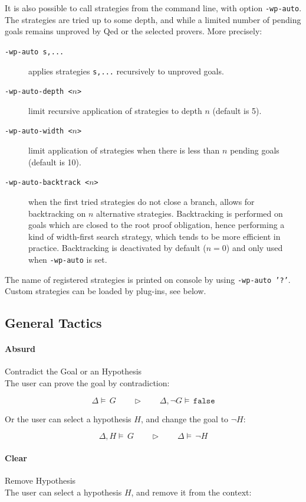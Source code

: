 It is also possible to call strategies from the command line, with option \texttt{-wp-auto}. The strategies are tried up to some depth, and while a limited number of pending goals
remains unproved by \textsf{Qed} or the selected provers. More precisely:
\begin{description}
\item[\tt -wp-auto s,...] applies strategies \texttt{s,...} recursively to unproved goals.
\item[\tt -wp-auto-depth <$n$>] limit recursive application of strategies to depth $n$ (default is 5).
\item[\tt -wp-auto-width <$n$>] limit application of strategies when there is less than $n$ pending goals (default is 10).
\item[\tt -wp-auto-backtrack <$n$>] when the first tried strategies do not close a branch, allows for backtracking
  on $n$ alternative strategies. Backtracking is performed on goals which are closed to the root proof obligation, hence
  performing a kind of width-first search strategy, which tends to be more efficient in practice.
  Backtracking is deactivated by default ($n=0$) and only used when \verb+-wp-auto+ is set.
\end{description}

The name of registered strategies is printed on console by using \texttt{-wp-auto '?'}. Custom strategies can be loaded by plug-ins, see below.

\newcommand{\TACTIC}[2]{#1\quad\quad\triangleright\quad\quad#2}

\subsection{General Tactics}

\paragraph{Absurd} Contradict the Goal or an Hypothesis\\
The user can prove the goal by contradiction:

$$ \TACTIC{\Delta\models\,G}{\Delta,\neg G\models\,\mathtt{false}} $$

Or the user can select a hypothesis $H$, and change the goal to $\neg H$:

$$ \TACTIC{\Delta,H\models\,G}{\Delta\models\,\neg H} $$

\paragraph{Clear} Remove Hypothesis\\
The user can select a hypothesis $H$, and remove it from the context:

